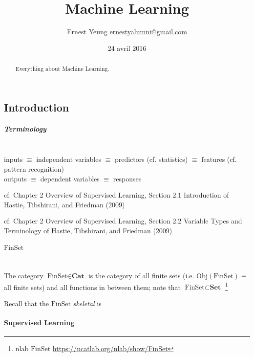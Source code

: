 \documentclass[10pt]{amsart}
\title{Machine Learning}
\author{Ernest Yeung \href{mailto:ernestyalumni@gmail.com}{ernestyalumni@gmail.com}}
\date{24 avril 2016}
\begin{document}

\maketitle

\tableofcontents


\begin{multicols*}{2}

\begin{abstract}
Everything about Machine Learning.  
\end{abstract}

\part{Introduction}

\subsubsection{Terminology} \quad \\ 
inputs $\equiv $ independent variables $\equiv $ predictors (cf. statistics) $ \equiv $ features (cf. pattern recognition) \\
outputs $\equiv $ dependent variables $\equiv $ responses

cf. Chapter 2 Overview of Supervised Learning, Section 2.1 Introduction of Hastie, Tibshirani, and Friedman (2009) \cite{HTF2009}

cf. Chapter 2 Overview of Supervised Learning, Section 2.2 Variable Types and Terminology  of Hastie, Tibshirani, and Friedman (2009) \cite{HTF2009}

\subsubsection{$\text{FinSet}$} \quad \\ 
The category $\text{FinSet} \in \mathbf{\text{Cat}}$ is the category of all finite sets (i.e. $\text{Obj}(\text{FinSet}) \equiv $ all finite sets) and all functions in between them; note that $\text{FinSet} \subset \mathbf{\text{Set}}$ \footnote{nlab $\text{FinSet}$ \url{https://ncatlab.org/nlab/show/FinSet}}

Recall that the $\text{FinSet}$ \emph{skeletal} is


\subsection{Supervised Learning}


\end{multicols*}
\end{document}
